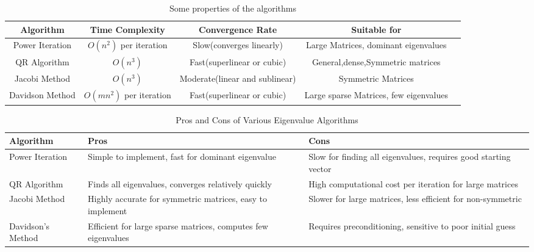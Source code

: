 \documentclass[journal]{IEEEtran}
\begin{document}
\begin{table}[h!]
\centering
\begin{tabular}[13pt]{ |c|c|c|c|c|}
	\hline
	\textbf{Algorithm} & \textbf{Time Complexity} & \textbf{Convergence Rate} & \textbf{Suitable for}\\
	\hline
	Power Iteration & \(O(n^2)\) per iteration & Slow(converges linearly) & Large Matrices, dominant eigenvalues \\
	\hline
	QR Algorithm & \(O(n^3)\) & Fast(superlinear or cubic) & General,dense,Symmetric matrices \\
	\hline
	Jacobi Method & \(O(n^3)\) & Moderate(linear and sublinear) & Symmetric Matrices \\
	\hline
	Davidson Method & \(O(mn^2)\) per iteration & Fast(superlinear or cubic) & Large sparse Matrices, few eigenvalues \\
	\hline
\end{tabular}
\caption{Some properties of the algorithms}
\end{table}

\begin{table}[h!]
\centering
\begin{tabular}{|l|p{7cm}|p{7cm}|}
	\hline
	\textbf{Algorithm}          & \textbf{Pros}                                                 & \textbf{Cons}                                                 \\
	\hline
	Power Iteration             & Simple to implement, fast for dominant eigenvalue            & Slow for finding all eigenvalues, requires good starting vector \\ 
	\hline
	QR Algorithm                & Finds all eigenvalues, converges relatively quickly           & High computational cost per iteration for large matrices       \\ 
	\hline
	Jacobi Method               & Highly accurate for symmetric matrices, easy to implement     & Slower for large matrices, less efficient for non-symmetric     \\ 
	\hline
	Davidson's Method           & Efficient for large sparse matrices, computes few eigenvalues & Requires preconditioning, sensitive to poor initial guess     \\ 
	\hline
\end{tabular}
\caption{Pros and Cons of Various Eigenvalue Algorithms}
\end{table}
\end{document}
